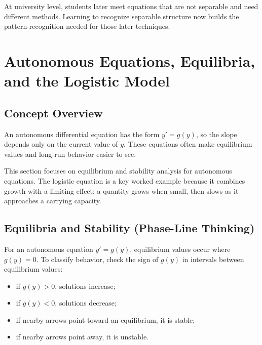 \documentclass[12pt]{article}
\begin{document}

\begin{enrichmentbox}
At university level, students later meet equations that are not separable and need different methods. Learning to recognize separable structure now builds the pattern-recognition needed for those later techniques.
\end{enrichmentbox}

\section{Autonomous Equations, Equilibria, and the Logistic Model}

\subsection{Concept Overview}
An autonomous differential equation has the form $y'=g(y)$, so the slope depends only on the current value of $y$. These equations often make equilibrium values and long-run behavior easier to see.

This section focuses on equilibrium and stability analysis for autonomous equations. The logistic equation is a key worked example because it combines growth with a limiting effect: a quantity grows when small, then slows as it approaches a carrying capacity.

\subsection{Equilibria and Stability (Phase-Line Thinking)}
For an autonomous equation $y'=g(y)$, equilibrium values occur where $g(y)=0$. To classify behavior, check the sign of $g(y)$ in intervals between equilibrium values:
\begin{itemize}[leftmargin=*]
  \item if $g(y)>0$, solutions increase;
  \item if $g(y)<0$, solutions decrease;
  \item if nearby arrows point toward an equilibrium, it is stable;
  \item if nearby arrows point away, it is unstable.
\end{itemize}
\end{document}

